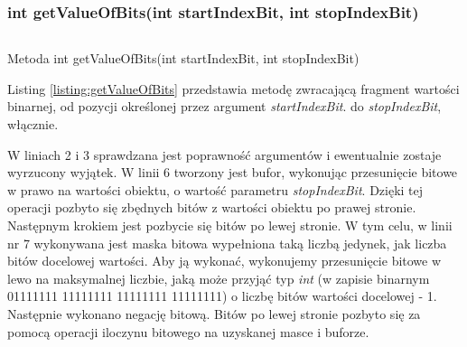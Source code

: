 \subsubsection{int getValueOfBits(int startIndexBit, int stopIndexBit)}
\begin{listing}[h]
	\inputminted{java}{listings/xbit/getValueOfBits.java}
	\caption{Metoda int getValueOfBits(int startIndexBit, int stopIndexBit)}
	\label{listing:getValueOfBits}
\end{listing}
Listing \ref{listing:getValueOfBits} przedstawia metodę zwracającą fragment wartości binarnej, od pozycji określonej przez argument \emph{startIndexBit}. do \emph{stopIndexBit}, włącznie.

W liniach 2 i 3 sprawdzana jest poprawność argumentów i ewentualnie zostaje wyrzucony wyjątek.  W linii 6 tworzony jest bufor, wykonując przesunięcie bitowe w prawo na wartości obiektu, o wartość parametru \emph{stopIndexBit}. Dzięki tej operacji pozbyto się zbędnych bitów z wartości obiektu po prawej stronie. Następnym krokiem jest pozbycie się bitów po lewej stronie. W tym celu, w linii nr 7 wykonywana jest maska bitowa wypełniona taką liczbą jedynek, jak liczba bitów docelowej wartości. Aby ją wykonać, wykonujemy przesunięcie bitowe w lewo na maksymalnej liczbie, jaką może przyjąć typ \emph{int} (w zapisie binarnym 01111111 11111111 11111111 11111111) o liczbę bitów wartości docelowej - 1. Następnie wykonano negację bitową. Bitów po lewej stronie pozbyto się za pomocą operacji iloczynu bitowego na uzyskanej masce i buforze.

